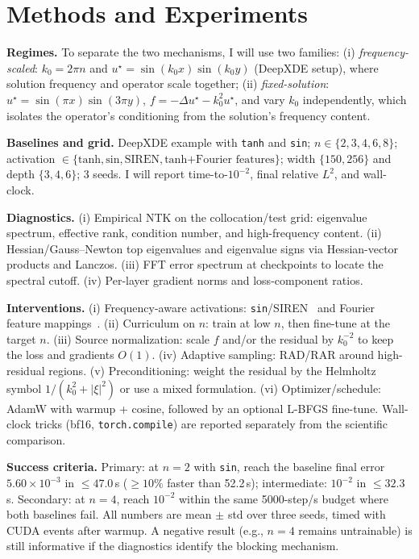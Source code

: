 \documentclass[10pt]{article}
\begin{document}
\section{Methods and Experiments}

\textbf{Regimes.} To separate the two mechanisms, I will use two families:
(i) \emph{frequency-scaled}: $k_0=2\pi n$ and $u^\star=\sin(k_0x)\sin(k_0y)$ (DeepXDE setup), where solution frequency and operator scale together;
(ii) \emph{fixed-solution}: $u^\star=\sin(\pi x)\sin(3\pi y)$, $f=-\Delta u^\star-k_0^2u^\star$, and vary $k_0$ independently, which isolates the operator's conditioning from the solution's frequency content.

\textbf{Baselines and grid.} DeepXDE example with \texttt{tanh} and \texttt{sin}; $n\in\{2,3,4,6,8\}$; activation $\in\{\text{tanh},\text{sin},\text{SIREN},\text{tanh+Fourier features}\}$; width $\{150,256\}$ and depth $\{3,4,6\}$; 3 seeds. I will report time-to-$10^{-2}$, final relative $L^2$, and wall-clock.

\textbf{Diagnostics.} (i) Empirical NTK on the collocation/test grid: eigenvalue spectrum, effective rank, condition number, and high-frequency content. (ii) Hessian/Gauss--Newton top eigenvalues and eigenvalue signs via Hessian-vector products and Lanczos. (iii) FFT error spectrum at checkpoints to locate the spectral cutoff. (iv) Per-layer gradient norms and loss-component ratios.

\textbf{Interventions.} (i) Frequency-aware activations: \texttt{sin}/SIREN~\cite{siren} and Fourier feature mappings~\cite{fourier}. (ii) Curriculum on $n$: train at low $n$, then fine-tune at the target $n$. (iii) Source normalization: scale $f$ and/or the residual by $k_0^{-2}$ to keep the loss and gradients $O(1)$. (iv) Adaptive sampling: RAD/RAR around high-residual regions. (v) Preconditioning: weight the residual by the Helmholtz symbol $1/(k_0^2+|\xi|^2)$ or use a mixed formulation. (vi) Optimizer/schedule: AdamW with warmup + cosine, followed by an optional L-BFGS fine-tune. Wall-clock tricks (bf16, \texttt{torch.compile}) are reported separately from the scientific comparison.

\textbf{Success criteria.} Primary: at $n=2$ with \texttt{sin}, reach the baseline final error $5.60\times10^{-3}$ in $\le47.0$\,s ($\ge10\%$ faster than 52.2\,s); intermediate: $10^{-2}$ in $\le32.3$\,s. Secondary: at $n=4$, reach $10^{-2}$ within the same 5000-step/s budget where both baselines fail. All numbers are mean $\pm$ std over three seeds, timed with CUDA events after warmup. A negative result (e.g., $n=4$ remains untrainable) is still informative if the diagnostics identify the blocking mechanism.
\end{document}
